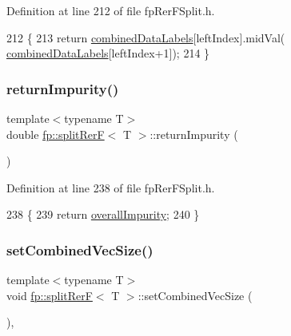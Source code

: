 Definition at line 212 of file fp\+Rer\+F\+Split.\+h.


\begin{DoxyCode}
212                                               \{
213                     \textcolor{keywordflow}{return} \hyperlink{classfp_1_1splitRerF_a2ce4d0a7ae4ba4958ddcc1adba71b2c9}{combinedDataLabels}[leftIndex].midVal(
      \hyperlink{classfp_1_1splitRerF_a2ce4d0a7ae4ba4958ddcc1adba71b2c9}{combinedDataLabels}[leftIndex+1]);
214                 \}
\end{DoxyCode}
\mbox{\label{classfp_1_1splitRerF_ab1bfbd05c673d7806dfdc2f7b948ee8d}} 
\subsubsection{\texorpdfstring{return\+Impurity()}{returnImpurity()}}
{\footnotesize\ttfamily template$<$typename T$>$ \\
double \hyperlink{classfp_1_1splitRerF}{fp\+::split\+RerF}$<$ T $>$\+::return\+Impurity (\begin{DoxyParamCaption}{ }\end{DoxyParamCaption})\hspace{0.3cm}{\ttfamily [inline]}}



Definition at line 238 of file fp\+Rer\+F\+Split.\+h.


\begin{DoxyCode}
238                                               \{
239                     \textcolor{keywordflow}{return} \hyperlink{classfp_1_1splitRerF_a4b2291a2bf5d4bd6b7d45b0e7037c5cc}{overallImpurity};
240                 \}
\end{DoxyCode}
\mbox{\label{classfp_1_1splitRerF_aa1ccd2bea54313e731cfd85d4026c53c}} 
\subsubsection{\texorpdfstring{set\+Combined\+Vec\+Size()}{setCombinedVecSize()}}
{\footnotesize\ttfamily template$<$typename T$>$ \\
void \hyperlink{classfp_1_1splitRerF}{fp\+::split\+RerF}$<$ T $>$\+::set\+Combined\+Vec\+Size (\begin{DoxyParamCaption}{ }\end{DoxyParamCaption})\hspace{0.3cm}{\ttfamily [inline]}, {\ttfamily [protected]}}



